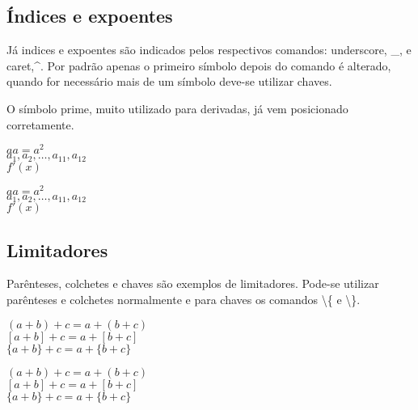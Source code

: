 \subsection{Índices e expoentes}
Já indices e expoentes são indicados pelos respectivos comandos: underscore, \_, e caret,\textasciicircum. Por padrão apenas o primeiro símbolo depois do comando é alterado, quando for necessário mais de um símbolo deve-se utilizar chaves.

O símbolo prime, muito utilizado para derivadas, já vem posicionado corretamente. \\
\begin{minipage}[t]{0.47\linewidth} \vspace{-8pt}
    \begin{latexcode}
        $a a = a^2$ \\
        $a_1, a_2, \dots, a_11, a_{12}$ \\
        $f'(x)$
    \end{latexcode}
\end{minipage} \hfill
\begin{minipage}[t]{0.47\linewidth} \vspace{0pt}
    $a a = a^2$ \\
    $a_1, a_2, \dots, a_11, a_{12}$ \\
    $f'(x)$
\end{minipage}

\subsection{Limitadores}
Parênteses, colchetes e chaves são exemplos de limitadores. Pode-se utilizar parênteses e colchetes normalmente e para chaves os comandos \textbackslash\{ e \textbackslash\}. \\
\begin{minipage}[t]{0.47\linewidth} \vspace{-8pt}
    \begin{latexcode}
        $(a + b) + c = a + (b + c)$ \\
        $[a + b] + c = a + [b + c]$ \\
        $\{a + b\} + c = a + \{b + c\}$
    \end{latexcode}
\end{minipage} \hfill
\begin{minipage}[t]{0.47\linewidth} \vspace{0pt}
    $(a + b) + c = a + (b + c)$ \\
    $[a + b] + c = a + [b + c]$ \\
    $\{a + b\} + c = a + \{b + c\}$
\end{minipage}

